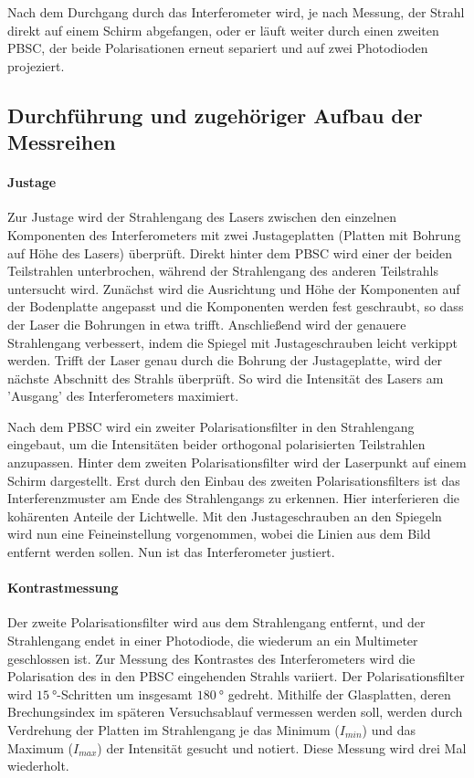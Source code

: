 Nach dem Durchgang durch das Interferometer wird, je nach Messung, der Strahl direkt auf einem Schirm abgefangen, oder er läuft weiter durch einen zweiten PBSC, der beide Polarisationen erneut separiert und auf zwei Photodioden projeziert.
\FloatBarrier

\subsection{Durchführung und zugehöriger Aufbau der Messreihen}
\paragraph{Justage}
Zur Justage wird der Strahlengang des Lasers zwischen den einzelnen Komponenten des Interferometers mit zwei Justageplatten (Platten mit Bohrung auf Höhe des Lasers) überprüft.
Direkt hinter dem PBSC wird einer der beiden Teilstrahlen unterbrochen, während der Strahlengang des anderen Teilstrahls untersucht wird.
Zunächst wird die Ausrichtung und Höhe der Komponenten auf der Bodenplatte angepasst und die Komponenten werden fest geschraubt, so dass der Laser die Bohrungen in etwa trifft.
Anschließend wird der genauere Strahlengang verbessert, indem die Spiegel mit Justageschrauben leicht verkippt werden.
Trifft der Laser genau durch die Bohrung der Justageplatte, wird der nächste Abschnitt des Strahls überprüft.
So wird die Intensität des Lasers am 'Ausgang' des Interferometers maximiert.

Nach dem PBSC wird ein zweiter Polarisationsfilter in den Strahlengang eingebaut, um die Intensitäten beider orthogonal polarisierten Teilstrahlen anzupassen.
Hinter dem zweiten Polarisationsfilter wird der Laserpunkt auf einem Schirm dargestellt.
Erst durch den Einbau des zweiten Polarisationsfilters ist das Interferenzmuster am Ende des Strahlengangs zu erkennen.
Hier interferieren die kohärenten Anteile der Lichtwelle.
Mit den Justageschrauben an den Spiegeln wird nun eine Feineinstellung vorgenommen, wobei die Linien aus dem Bild entfernt werden sollen.
Nun ist das Interferometer justiert.

\paragraph{Kontrastmessung}
Der zweite Polarisationsfilter wird aus dem Strahlengang entfernt, und der Strahlengang endet in einer Photodiode, die wiederum an ein Multimeter geschlossen ist.
Zur Messung des Kontrastes des Interferometers wird die Polarisation des in den PBSC eingehenden Strahls variiert.
Der Polarisationsfilter wird $\SI{15}{°}$-Schritten um insgesamt $\SI{180}{°}$ gedreht.
Mithilfe der Glasplatten, deren Brechungsindex im späteren Versuchsablauf vermessen werden soll, werden durch Verdrehung der Platten im Strahlengang je das Minimum ($I_{min}$) und das Maximum ($I_{max}$) der Intensität gesucht und notiert.
Diese Messung wird drei Mal wiederholt.

